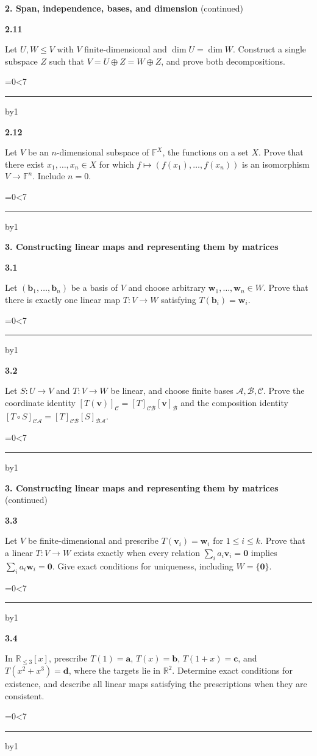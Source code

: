 \documentclass[11pt,letterpaper]{article}
\newcommand{\topicshort}{Problem collection}
\newcommand{\F}{\mathbb F}\newcommand{\R}{\mathbb R}\newcommand{\Q}{\mathbb Q}\newcommand{\C}{\mathbb C}\newcommand{\Z}{\mathbb Z}
\newcommand{\A}{\mathcal A}\newcommand{\B}{\mathcal B}
\newcommand{\ruled}[1]{\par\begingroup\parskip=0pt\baselineskip=17pt\count255=0\loop\ifnum\count255<#1\noindent\textcolor{black!17}{\rule{\linewidth}{.25pt}}\par\advance\count255 by1\repeat\endgroup}
\newcommand{\problem}[4]{\noindent\begin{minipage}[t][3.48in][t]{\linewidth}\textbf{\color{navy}#1}\quad{\small\sffamily\color{teal}#2#3}\par #4\par\vfill\ruled{7}\end{minipage}}
\begin{document}
{\large\bfseries\color{navy}2. Span, independence, bases, and dimension} {\small(continued)}\par\vspace{9pt}
\problem{2.11}{C}{}{Let $U,W\le V$ with $V$ finite-dimensional and $\dim U=\dim W$. Construct a single subspace $Z$ such that $V=U\oplus Z=W\oplus Z$, and prove both decompositions.}
\par\vspace{14pt}
\problem{2.12}{C}{}{Let $V$ be an $n$-dimensional subspace of $\F^X$, the functions on a set $X$. Prove that there exist $x_1,\ldots,x_n\in X$ for which $f\mapsto(f(x_1),\ldots,f(x_n))$ is an isomorphism $V\to\F^n$. Include $n=0$.}
\newpage
\renewcommand{\topicshort}{Maps and matrices}
{\large\bfseries\color{navy}3. Constructing linear maps and representing them by matrices}\par\vspace{9pt}
\problem{3.1}{W}{ / $\star$}{Let $(\mathbf b_1,\ldots,\mathbf b_n)$ be a basis of $V$ and choose arbitrary $\mathbf w_1,\ldots,\mathbf w_n\in W$. Prove that there is exactly one linear map $T:V\to W$ satisfying $T(\mathbf b_i)=\mathbf w_i$.}
\par\vspace{14pt}
\problem{3.2}{W}{ / $\star$}{Let $S:U\to V$ and $T:V\to W$ be linear, and choose finite bases $\A,\B,\mathcal C$. Prove the coordinate identity $[T(\mathbf v)]_{\mathcal C}=[T]_{\mathcal C\B}[\mathbf v]_\B$ and the composition identity $[T\circ S]_{\mathcal C\A}=[T]_{\mathcal C\B}[S]_{\B\A}$.}
\newpage
\renewcommand{\topicshort}{Maps and matrices}
{\large\bfseries\color{navy}3. Constructing linear maps and representing them by matrices} {\small(continued)}\par\vspace{9pt}
\problem{3.3}{M}{ / $\star$}{Let $V$ be finite-dimensional and prescribe $T(\mathbf v_i)=\mathbf w_i$ for $1\le i\le k$. Prove that a linear $T:V\to W$ exists exactly when every relation $\sum_i a_i\mathbf v_i=\mathbf0$ implies $\sum_i a_i\mathbf w_i=\mathbf0$. Give exact conditions for uniqueness, including $W=\{\mathbf0\}$.}
\par\vspace{14pt}
\problem{3.4}{M}{}{In $\R_{\le3}[x]$, prescribe $T(1)=\mathbf a$, $T(x)=\mathbf b$, $T(1+x)=\mathbf c$, and $T(x^2+x^3)=\mathbf d$, where the targets lie in $\R^2$. Determine exact conditions for existence, and describe all linear maps satisfying the prescriptions when they are consistent.}
\end{document}
